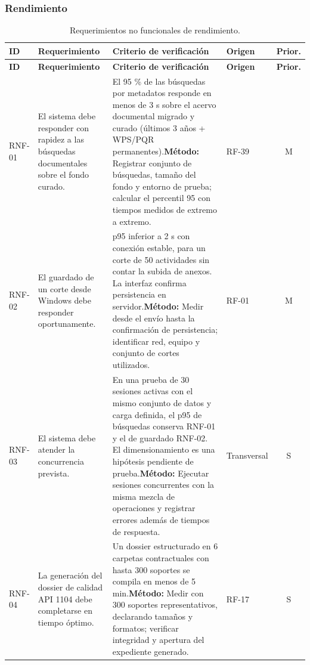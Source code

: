 \documentclass[12pt,letterpaper]{article}
\begin{document}
\subsubsection{Rendimiento}

{\small
\begin{longtable}{@{}L{1.8cm} L{4.65cm} L{4.75cm} L{2.1cm} c@{}}
\caption{Requerimientos no funcionales de rendimiento.}\\
\toprule{}
\textbf{ID} & \textbf{Requerimiento} & \textbf{Criterio de verificación} & \textbf{Origen} & \textbf{Prior.} \\
\midrule
\endfirsthead
\toprule{}
\textbf{ID} & \textbf{Requerimiento} & \textbf{Criterio de verificación} & \textbf{Origen} & \textbf{Prior.} \\
\midrule
\endhead
\bottomrule
\endfoot
RNF-01 & El sistema debe responder con rapidez a las búsquedas documentales sobre el fondo curado. & El 95 \% de las búsquedas por metadatos responde en menos de 3 s sobre el acervo documental migrado y curado (últimos 3 años + WPS/PQR permanentes).\newline \textbf{Método:} Registrar conjunto de búsquedas, tamaño del fondo y entorno de prueba; calcular el percentil 95 con tiempos medidos de extremo a extremo. & RF-39 & M \\
RNF-02 & El guardado de un corte desde Windows debe responder oportunamente. & p95 inferior a 2 s con conexión estable, para un corte de 50 actividades sin contar la subida de anexos. La interfaz confirma persistencia en servidor.\newline \textbf{Método:} Medir desde el envío hasta la confirmación de persistencia; identificar red, equipo y conjunto de cortes utilizados. & RF-01 & M \\
RNF-03 & El sistema debe atender la concurrencia prevista. & En una prueba de 30 sesiones activas con el mismo conjunto de datos y carga definida, el p95 de búsquedas conserva RNF-01 y el de guardado RNF-02. El dimensionamiento es una hipótesis pendiente de prueba.\newline \textbf{Método:} Ejecutar sesiones concurrentes con la misma mezcla de operaciones y registrar errores además de tiempos de respuesta. & Transversal & S \\
RNF-04 & La generación del dossier de calidad API 1104 debe completarse en tiempo óptimo. & Un dossier estructurado en 6 carpetas contractuales con hasta 300 soportes se compila en menos de 5 min.\newline \textbf{Método:} Medir con 300 soportes representativos, declarando tamaños y formatos; verificar integridad y apertura del expediente generado. & RF-17 & S \\
\end{longtable}
}
\end{document}
